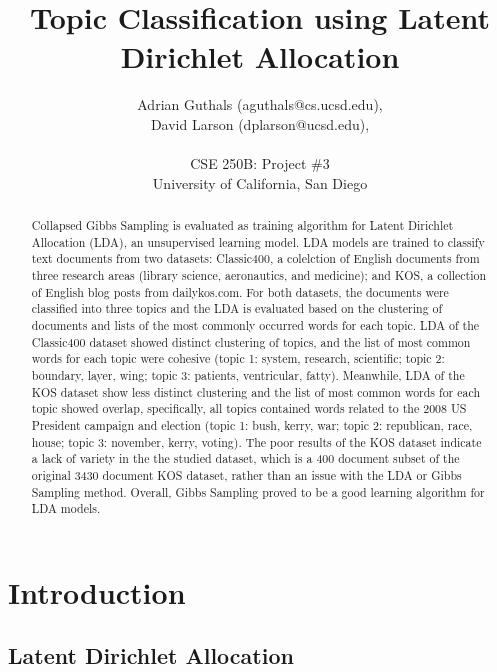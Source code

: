 \documentclass[10pt]{article}
\title{Topic Classification using Latent Dirichlet Allocation}
\author{Adrian Guthals (aguthals@cs.ucsd.edu),\\
David Larson (dplarson@ucsd.edu),\\
\\
CSE 250B: Project \#3 \\
University of California, San Diego \\
}
\begin{document}
\maketitle


\begin{abstract}
Collapsed Gibbs Sampling is evaluated as training algorithm for Latent Dirichlet Allocation (LDA), an unsupervised learning model. LDA models are trained to classify text documents from two datasets: Classic400, a colelction of English documents from three research areas (library science, aeronautics, and medicine); and KOS, a collection of English blog posts from dailykos.com. For both datasets, the documents were classified into three topics and the LDA is evaluated based on the clustering of documents and lists of the most commonly occurred words for each topic. LDA of the Classic400 dataset showed distinct clustering of topics, and the list of most common words for each topic were cohesive (topic 1: system, research, scientific; topic 2: boundary, layer, wing; topic 3: patients, ventricular, fatty). Meanwhile, LDA of the KOS dataset show less distinct clustering and the list of most common words for each topic showed overlap, specifically, all topics contained words related to the 2008 US President campaign and election (topic 1: bush, kerry, war; topic 2: republican, race, house; topic 3: november, kerry, voting). The poor results of the KOS dataset indicate a lack of variety in the the studied dataset, which is a 400 document subset of the original 3430 document KOS dataset, rather than an issue with the LDA or Gibbs Sampling method. Overall, Gibbs Sampling proved to be a good learning algorithm for LDA models.
\end{abstract}



\section{Introduction}
\label{sec:intro}

\subsection{Latent Dirichlet Allocation}
\label{sec:lda}
\end{document}
